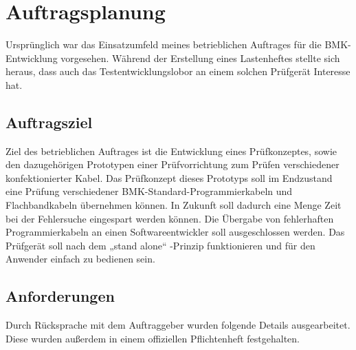 \documentclass[a4paper,11pt]{scrartcl}
\begin{document}
\section{Auftragsplanung}


\begin{center}
Ursprünglich war das Einsatzumfeld meines betrieblichen Auftrages für die BMK-Entwicklung vorgesehen. Während der Erstellung eines Lastenheftes stellte sich heraus, dass auch das Testentwicklungslobor an einem solchen Prüfgerät Interesse hat. 
\end{center}



\subsection{Auftragsziel}

Ziel des betrieblichen Auftrages ist die Entwicklung eines Prüfkonzeptes, sowie den dazugehörigen Prototypen einer Prüfvorrichtung zum Prüfen verschiedener konfektionierter Kabel. Das Prüfkonzept dieses Prototyps soll im Endzustand eine Prüfung verschiedener BMK-Standard-Programmierkabeln und Flachbandkabeln übernehmen können. 
In Zukunft soll dadurch eine Menge Zeit bei der Fehlersuche eingespart werden können. Die Übergabe von fehlerhaften Programmierkabeln an einen Softwareentwickler soll ausgeschlossen werden.
Das Prüfgerät soll nach dem „stand alone“ -Prinzip funktionieren und für den Anwender einfach zu bedienen sein.


\subsection{Anforderungen}

Durch Rücksprache mit dem Auftraggeber wurden folgende Details ausgearbeitet. Diese wurden außerdem in einem offiziellen Pflichtenheft festgehalten. 
\end{document}
